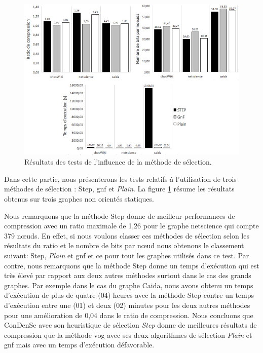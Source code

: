 		\begin{figure}[H]
	
			
			\includegraphics[scale=0.7]{ressources/image/vogcond.jpg}
			
			\caption{Résultats des tests de l'influence de la méthode de sélection.}
			\label{fig:test-vogcond}
	
		\end{figure}
		
		Dans cette partie, nous présenterons les tests relatifs à l'utilisation de trois méthodes de sélection : Step, \gls{gnf} et \textit{Plain}. La figure \ref{fig:test-vogcond} résume les résultats obtenus sur  trois graphes non orientés statiques.
		
		Nous remarquons que la méthode Step donne de meilleur performances de compression avec un ratio maximale de 1,26 pour le graphe netscience qui compte 379 nœuds. En effet, si nous voulons classer ces méthodes de sélection selon les résultats du ratio et le nombre de bits par nœud nous obtenons le classement suivant: Step, \textit{Plain} et \gls{gnf} et ce pour tout les graphes utilisés dans ce test. Par contre, nous remarquons que la méthode Step donne un temps d'exécution qui est très élevé par rapport aux deux autres méthodes surtout dans le cas des grands graphes. Par exemple dans le cas du graphe Caida, nous avons obtenu un temps d'exécution de plus de quatre (04) heures avec la méthode Step  contre un temps d'exécution entre une (01) et deux (02) minutes pour les deux autres méthodes pour une amélioration de 0,04 dans le ratio de compression. Nous concluons que \gls{ConDenSe} avec son heuristique de sélection \textit{Step} donne de meilleures résultats de compression que la méthode \gls{vog} avec ses deux algorithmes de sélection \textit{Plain} et \gls{gnf} mais avec un temps d'exécution défavorable.
		
